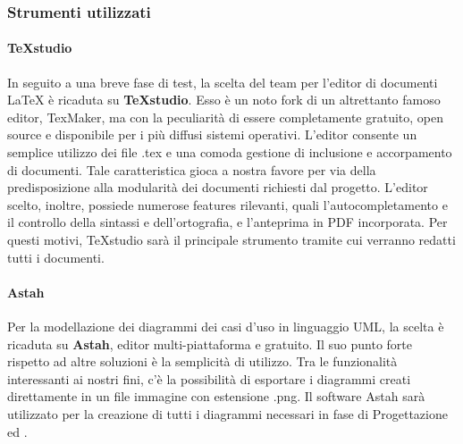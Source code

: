 \subsubsection{Strumenti utilizzati}

\paragraph{TeXstudio}
In seguito a una breve fase di test, la scelta del team per l'editor di documenti LaTeX è ricaduta su \textbf{TeXstudio}. Esso è un noto fork di un altrettanto famoso editor, TexMaker, ma con la peculiarità di essere completamente gratuito, open source e disponibile per i più diffusi sistemi operativi. L'editor consente un semplice utilizzo dei file .tex e una comoda gestione di inclusione e accorpamento di documenti. Tale caratteristica gioca a nostra favore per via della predisposizione alla modularità dei documenti richiesti dal progetto. L'editor scelto, inoltre, possiede numerose features rilevanti, quali l'autocompletamento e il controllo della sintassi e dell'ortografia, e l'anteprima in PDF incorporata. Per questi motivi, TeXstudio sarà il principale strumento tramite cui verranno redatti tutti i documenti.

\paragraph{Astah}
Per la modellazione dei diagrammi dei casi d'uso in linguaggio UML, la scelta è ricaduta su \textbf{Astah}, editor multi-piattaforma e gratuito. Il suo punto forte rispetto ad altre soluzioni è la semplicità di utilizzo. Tra le funzionalità interessanti ai nostri fini, c'è la possibilità di esportare i diagrammi creati direttamente in un file immagine con estensione .png. Il software Astah sarà utilizzato per la creazione di tutti i diagrammi necessari in fase di Progettazione ed \AdR.
